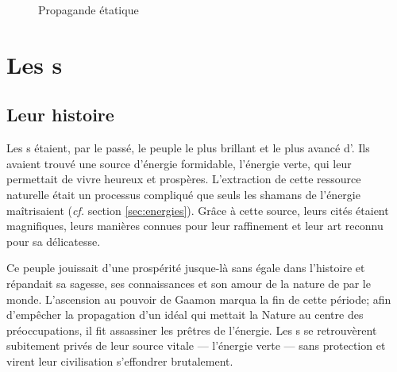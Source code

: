\begin{figure}[ht!]
	\hspace*{.04\textwidth}
	\caption{\label{fig:propagandeEtatique}Propagande étatique}
\end{figure}



\section{Les \nomNaturels s}

\subsection{Leur histoire}
\label{sec:histoireNaturels}
Les \nomNaturels s étaient, par le passé, le peuple le plus brillant et le plus avancé d'\nomUnivers. Ils avaient trouvé une source d'énergie formidable, l'énergie verte, qui leur permettait de vivre heureux et prospères. L'extraction de cette ressource naturelle était un processus compliqué que seuls les shamans de l'énergie maîtrisaient (\textit{cf.} section \ref{sec:energies}). Grâce à cette source, leurs cités étaient magnifiques, leurs manières connues pour leur raffinement et leur art reconnu pour sa délicatesse.

Ce peuple jouissait d'une prospérité jusque-là sans égale dans l'histoire et répandait sa sagesse, ses connaissances et son amour de la nature de par le monde. L'ascension au pouvoir de Gaamon marqua la fin de cette période; afin d'empêcher la propagation d'un idéal qui mettait la Nature au centre des préoccupations, il fit assassiner les prêtres de l'énergie. Les \nomNaturels s se retrouvèrent subitement privés de leur source vitale --- l'énergie verte --- sans protection et virent leur civilisation s'effondrer brutalement.

